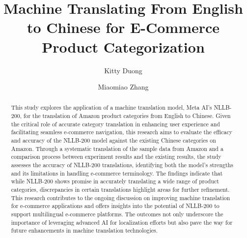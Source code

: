 \documentclass[sigconf]{acmart}
\begin{document}
\title{Machine Translating From English to Chinese for E-Commerce Product Categorization}

\author{Kitty Duong}

\author{Miaomiao Zhang}

\begin{abstract}
This study explores the application of a machine translation model, Meta AI's NLLB-200\cite{Meta_AI_Research_Topic}, for the translation of Amazon product categories from English to Chinese. Given the critical role of accurate category translation in enhancing user experience and facilitating seamless e-commerce navigation, this research aims to evaluate the efficacy and accuracy of the NLLB-200 model against the existing Chinese categories on Amazon. Through a systematic translation of the sample data from Amazon and a comparison process between experiment results and the existing results, the study assesses the accuracy of NLLB-200 translations, identifying both the model's strengths and its limitations in handling e-commerce terminology. The findings indicate that while NLLB-200 shows promise in accurately translating a wide range of product categories, discrepancies in certain translations highlight areas for further refinement.\cite{moslem_2023} This research contributes to the ongoing discussion on improving machine translation for e-commerce applications and offers insights into the potential of NLLB-200 to support multilingual e-commerce platforms. The outcomes not only underscore the importance of leveraging advanced AI for localization efforts but also pave the way for future enhancements in machine translation technologies.

\end{abstract}

\maketitle
\end{document}
